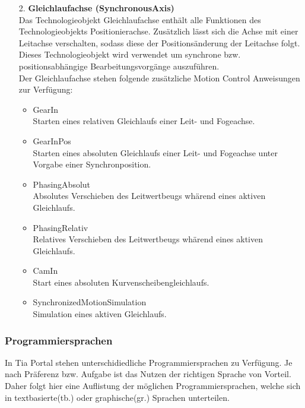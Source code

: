 \begin{itemize}
        \item[2.] \textbf{Gleichlaufachse (SynchronousAxis)} \\
            Das Technologieobjekt Gleichlaufachse enthält alle Funktionen des Technologieobjekts Positionierachse. Zusätzlich lässt sich die Achse mit einer Leitachse verschalten, sodass diese der Positionsänderung der Leitachse folgt. Dieses Technologieobjekt wird verwendet um synchrone bzw. positionsabhängige Bearbeitungsvorgänge auszuführen. \\
            Der Gleichlaufachse stehen folgende zusätzliche Motion Control Anweisungen zur Verfügung:
            \begin{itemize}
                \item GearIn \\
                    Starten eines relativen Gleichlaufs einer Leit- und Fogeachse.
                \item GearInPos \\
                    Starten eines absoluten Gleichlaufs einer Leit- und Fogeachse unter Vorgabe einer Synchronposition.
                \item PhasingAbsolut \\
                    Absolutes Verschieben des Leitwertbeugs whärend eines aktiven Gleichlaufs.
                \item PhasingRelativ \\
                    Relatives Verschieben des Leitwertbeugs whärend eines aktiven Gleichlaufs.
                \item CamIn \\
                    Start eines absoluten Kurvenscheibengleichlaufs.
                \item SynchronizedMotionSimulation \\
                    Simulation eines aktiven Gleichlaufs. 
            \end{itemize}
             
    \end{itemize}

    \subsubsection{Programmiersprachen}
    In Tia Portal stehen unterschidiedliche Programmiersprachen zu Verfügung. Je nach Präferenz bzw. Aufgabe ist das Nutzen der richtigen Sprache von Vorteil. Daher folgt hier eine Auflistung der möglichen Programmiersprachen, welche sich in textbasierte(tb.) oder graphische(gr.) Sprachen unterteilen. 

